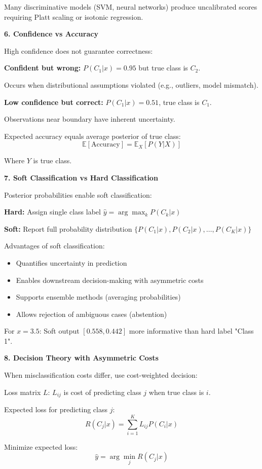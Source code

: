 \documentclass[12pt]{article}
\begin{document}
\begin{explanation}
Many discriminative models (SVM, neural networks) produce uncalibrated scores requiring Platt scaling or isotonic regression.

\textbf{6. Confidence vs Accuracy}

High confidence does not guarantee correctness:

\textbf{Confident but wrong:} $P(C_1|x) = 0.95$ but true class is $C_2$.

Occurs when distributional assumptions violated (e.g., outliers, model mismatch).

\textbf{Low confidence but correct:} $P(C_1|x) = 0.51$, true class is $C_1$.

Observations near boundary have inherent uncertainty.

Expected accuracy equals average posterior of true class:
\[\mathbb{E}[\text{Accuracy}] = \mathbb{E}_X[P(Y|X)]\]

Where $Y$ is true class.

\textbf{7. Soft Classification vs Hard Classification}

Posterior probabilities enable soft classification:

\textbf{Hard:} Assign single class label $\hat{y} = \arg\max_k P(C_k|x)$

\textbf{Soft:} Report full probability distribution $\{P(C_1|x), P(C_2|x), \ldots, P(C_K|x)\}$

Advantages of soft classification:
\begin{itemize}
\item Quantifies uncertainty in prediction
\item Enables downstream decision-making with asymmetric costs
\item Supports ensemble methods (averaging probabilities)
\item Allows rejection of ambiguous cases (abstention)
\end{itemize}

For $x = 3.5$: Soft output $[0.558, 0.442]$ more informative than hard label "Class 1".

\textbf{8. Decision Theory with Asymmetric Costs}

When misclassification costs differ, use cost-weighted decision:

Loss matrix $L$: $L_{ij}$ is cost of predicting class $j$ when true class is $i$.

Expected loss for predicting class $j$:
\[R(C_j|x) = \sum_{i=1}^K L_{ij} P(C_i|x)\]

Minimize expected loss:
\[\hat{y} = \arg\min_j R(C_j|x)\]


\end{explanation}
\end{document}
